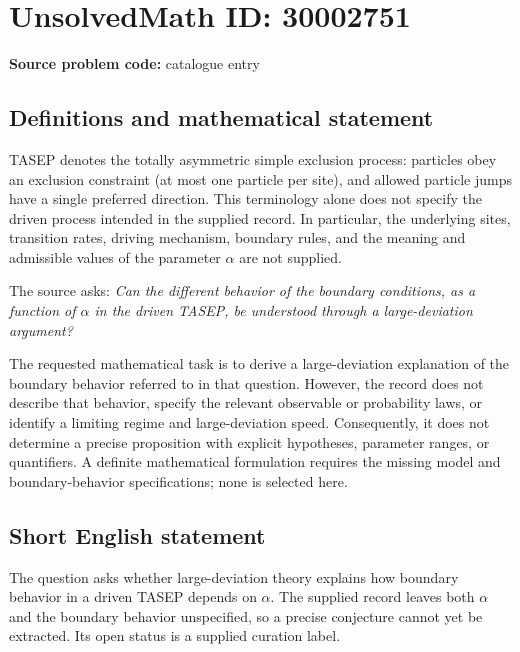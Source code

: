 \documentclass[11pt]{article}
\begin{document}
\section*{UnsolvedMath ID: 30002751}
\textbf{Source problem code:} catalogue entry
\subsection{Definitions and mathematical statement}
TASEP denotes the totally asymmetric simple exclusion process: particles obey an exclusion constraint (at most one particle per site), and allowed particle jumps have a single preferred direction. This terminology alone does not specify the driven process intended in the supplied record. In particular, the underlying sites, transition rates, driving mechanism, boundary rules, and the meaning and admissible values of the parameter \(\alpha\) are not supplied.

The source asks: \emph{Can the different behavior of the boundary conditions, as a function of \(\alpha\) in the driven TASEP, be understood through a large-deviation argument?}

The requested mathematical task is to derive a large-deviation explanation of the boundary behavior referred to in that question. However, the record does not describe that behavior, specify the relevant observable or probability laws, or identify a limiting regime and large-deviation speed. Consequently, it does not determine a precise proposition with explicit hypotheses, parameter ranges, or quantifiers. A definite mathematical formulation requires the missing model and boundary-behavior specifications; none is selected here.
\subsection{Short English statement}
The question asks whether large-deviation theory explains how boundary behavior in a driven TASEP depends on \(\alpha\). The supplied record leaves both \(\alpha\) and the boundary behavior unspecified, so a precise conjecture cannot yet be extracted. Its open status is a supplied curation label.
\end{document}
